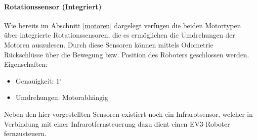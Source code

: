 \paragraph{Rotationssensor (Integriert)}
\color{finishing}
Wie bereits im Abschnitt \eqref{motoren} dargelegt verfügen die beiden Motortypen über integrierte Rotationssensoren, die es ermöglichen die Umdrehungen der Motoren auszulesen. Durch diese Sensoren können mittels Odometrie Rückschlüsse über die Bewegung bzw. Position des Roboters geschlossen werden.
\medskip
\newline
Eigenschaften:
\begin{itemize}
	\item{Genauigkeit: 1$^\circ$ }
	\item{Umdrehungen: Motorabhängig}
\end{itemize}
\bigskip
Neben den hier vorgestellten Sensoren existiert noch ein Infrarotsensor, welcher in Verbindung mit einer Infrarotfernsteuerung dazu dient einen EV3-Roboter fernzusteuern.
